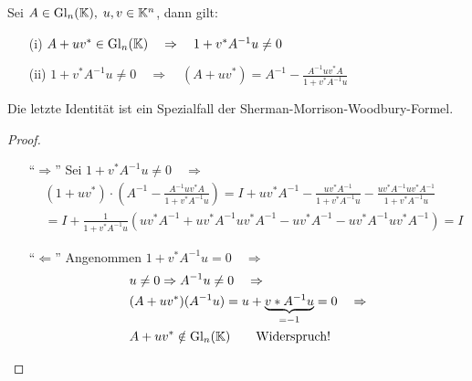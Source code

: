 \begin{Lemma}
Sei $A \in \mathrm{Gl}_n(\mathbb K), \; u, v \in \mathbb K^n$, dann gilt:
  \begin{enumerate}
    \item[(i)] $A + u  v^* \in \mathrm{Gl}_n(\mathbb K) \quad \Rightarrow \quad 1 + v^* A^{-1} u \ne 0$
    \item[(ii)] $1 + v^* A^{-1} u \ne 0  \quad \Rightarrow \quad
      (A + uv^*) = A^{-1} - \frac{A^{-1} u v^* A}{1 + v^*A^{-1}u}$
  \end{enumerate}
Die letzte Identität ist ein Spezialfall der Sherman-Morrison-Woodbury-Formel.
\end{Lemma}
\begin{proof}
\quad \\
  \begin{enumerate}
    \item["`$\Rightarrow$"'] Sei $1 + v^* A^{-1} u \ne 0 \quad \Rightarrow $
    \begin{align*}
    & (1 + u v^*)\cdot \left(A^{-1} - \frac{A^{-1} u v^* A}{1 + v^*A^{-1}u}  \right) =
    I + u v^*A^{-1} - \frac{u v^* A^{-1}}{1 + v^*A^{-1} u} -
       \frac{u v^* A^{-1}u v^* A^{-1}}{1 +  v^*A^{-1} u} \\
    & = I + \frac{1}{1 + v^*A^{-1}u} \left( u v^* A^{-1} + u v^* A^{-1} u v^* A^{-1} -
      u v^* A^{-1} - u v^* A^{-1} u v^* A^{-1} \right) = I
    \end{align*}

    \item["`$\Leftarrow$"'] Angenommen $1 + v^* A^{-1} u = 0 \quad \Rightarrow $
    \begin{align*}
      & u \ne 0 \Rightarrow A^{-1} u \ne 0 \quad \Rightarrow \\
      & (A + u v^*) (A^{-1} u) = u + \underbrace{v* A^{-1} u}_{= -1} = 0 \quad \Rightarrow \\
     &  A + u v^* \notin \mathrm{Gl}_n(\mathbb K) \qquad \text{Widerspruch!}
    \end{align*}
  \end{enumerate}
\end{proof}
